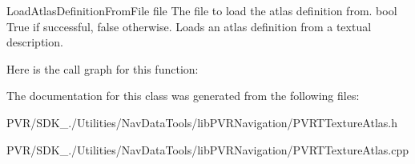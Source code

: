   Load\+Atlas\+Definition\+From\+File  file The file to load the atlas definition from.  bool True if successful, false otherwise.  Loads an atlas definition from a textual description. 

Here is the call graph for this function\+:




The documentation for this class was generated from the following files\+:\begin{DoxyCompactItemize}
\item 
P\+V\+R/\+S\+D\+K\+\_./\+Utilities/\+Nav\+Data\+Tools/lib\+P\+V\+R\+Navigation/P\+V\+R\+T\+Texture\+Atlas.\+h\item 
P\+V\+R/\+S\+D\+K\+\_./\+Utilities/\+Nav\+Data\+Tools/lib\+P\+V\+R\+Navigation/P\+V\+R\+T\+Texture\+Atlas.\+cpp\end{DoxyCompactItemize}
